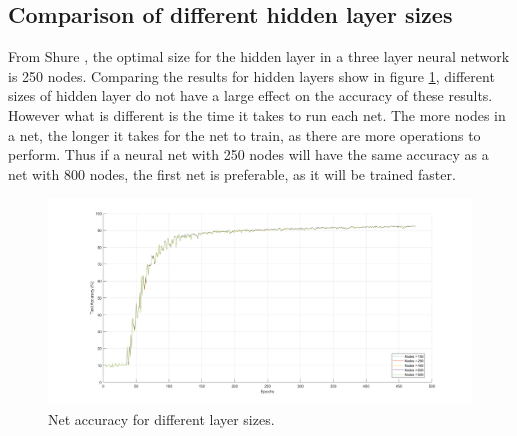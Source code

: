 \documentclass[12pt]{article}
\begin{document}
	\subsection{Comparison of different hidden layer sizes}
	
	From Shure \cite{matlabNNBeg}, the optimal size for the hidden layer in a three layer neural network is 250 nodes. Comparing the results for hidden layers show in figure \ref{fig:multiplelayers}, different sizes of hidden layer do not have a large effect on the accuracy of these results. However what is different is the time it takes to run each net. The more nodes in a net, the longer it takes for the net to train, as there are more operations to perform. Thus if a neural net with 250 nodes will have the same accuracy as a net with 800 nodes, the first net is preferable, as it will be trained faster.
	
	
	\begin{figure}
		\centering
		\includegraphics[width=0.7\linewidth]{multipleLayers}
		\caption{Net accuracy for different layer sizes.}
		\label{fig:multiplelayers}
	\end{figure}
	
	
\end{document}
